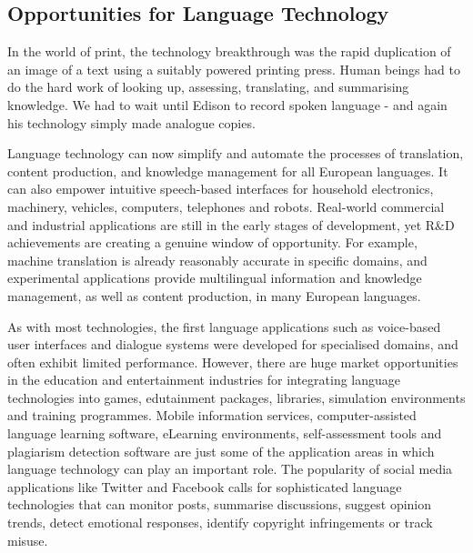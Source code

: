 \begin{multicols}{2}
\subsection{Opportunities for Language Technology}

In the world of print, the technology breakthrough was the rapid duplication of an image of a text using a suitably powered printing press. Human beings had to do the hard work of looking up, assessing, translating, and summarising knowledge. We had to wait until Edison to record spoken language - and again his technology simply made analogue copies.

Language technology can now simplify and automate the processes of translation, content production, and knowledge management for all European languages. It can also empower intuitive speech-based interfaces for household electronics, machinery, vehicles, computers, telephones and robots. Real-world commercial and industrial applications are still in the early stages of development, yet R\&D achievements are creating a genuine window of opportunity. For example, machine translation is already reasonably accurate in specific domains, and experimental applications provide multilingual information and knowledge management, as well as content production, in many European languages. 

As with most technologies, the first language applications such as voice-based user interfaces and dialogue systems were developed for specialised domains, and often exhibit limited performance. However, there are huge market opportunities in the education and entertainment industries for integrating language technologies into games, edutainment packages, libraries, simulation environments and training programmes. Mobile information services, computer-assisted language learning software, eLearning environments, self-assessment tools and plagiarism detection software are just some of the application areas in which language technology can play an important role. The popularity of social media applications like Twitter and Facebook calls for sophisticated language technologies that can monitor posts, summarise discussions, suggest opinion trends, detect emotional responses, identify copyright infringements or track misuse.



\end{multicols}
